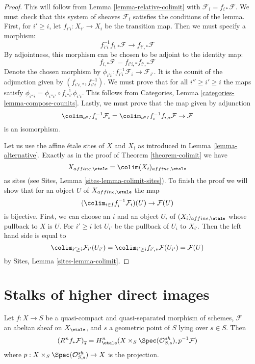 \begin{proof}
This will follow from Lemma \ref{lemma-relative-colimit}
with $\mathcal{F}_i = f_{i*}\mathcal{F}$. We 
must check that this system of sheaves $\mathcal{F}_i$ satisfies the conditions 
of the lemma. First, for $i' \geq i$, let
$f_{i'i}: X_{i'} \to X_i$ be 
the transition map. Then we must specify a morphism:
$$
f_{i'i}^{-1}f_{i, *}\mathcal{F} \to f_{i', *}\mathcal{F}
$$
By adjointness, this morphism can be chosen to be adjoint to the identity map:
$$
f_{i, *}\mathcal{F} = f_{i'i, *}f_{i', *}\mathcal{F}
$$
Denote the chosen morphism by
$\phi_{i'i} : f^{-1}_{i'i}\mathcal{F}_i \to \mathcal{F}_{i'}$.
It is the counit of the adjunction given by 
$(f_{i'i, *}, f_{i'i}^{-1})$. We must prove that for all
$i'' \geq i' \geq i$ the maps satisfy
$\phi_{i''i} = \phi_{i''i'}\circ f_{i''i'}^{-1}\phi_{i'i}$. 
This follows from Categories, Lemma \ref{categories-lemma-compose-counits}.
Lastly, we must prove that the map given by adjunction
$$
\colim_{i \in I} f_i^{-1}\mathcal{F}_i =
\colim_{i \in I} f_i^{-1}f_{i, *}\mathcal{F}
\to \mathcal{F}
$$
is an isomorphism.

\medskip\noindent
Let us use the affine \'etale sites of $X$ and $X_i$ as introduced
in Lemma \ref{lemma-alternative}.
Exactly as in the proof of Theorem \ref{theorem-colimit} we have
$$
X_{affine, \etale} = \colim (X_i)_{affine, \etale}
$$
as sites (see Sites, Lemma \ref{sites-lemma-colimit-sites}).
To finish the proof we will show
that for an object $U$ of $X_{affine, \etale}$
the map
$$
(\colim_{i \in I} f_i^{-1}\mathcal{F}_i)(U) \to \mathcal{F}(U)
$$
is bijective. First, we can choose an $i$ and an object
$U_i$ of $(X_i)_{affine, \etale}$ whose pullback to $X$ is $U$.
For $i' \geq i$ let $U_{i'}$ be the pullback of $U_i$ to $X_{i'}$.
Then the left hand side is equal to
$$
\colim_{i' \geq i} \mathcal{F}_{i'}(U_{i'}) =
\colim_{i' \geq i} f_{i', *}\mathcal{F}(U_{i'}) =
\mathcal{F}(U)
$$
by Sites, Lemma \ref{sites-lemma-colimit}.
\end{proof}





\section{Stalks of higher direct images}
\label{section-stalks-direct-image}

\begin{theorem}
\label{theorem-higher-direct-images}
Let $f: X \to S$ be a quasi-compact and quasi-separated morphism of schemes,
$\mathcal{F}$ an abelian sheaf on $X_\etale$, and $\overline{s}$ a
geometric point of $S$ lying over $s \in S$. Then
$$
\left(R^nf_* \mathcal{F}\right)_{\overline{s}} =
H_\etale^n( X \times_S \Spec(\mathcal{O}_{S, s}^{sh}),
p^{-1}\mathcal{F})
$$
where $p : X \times_S \Spec(\mathcal{O}_{S, s}^{sh}) \to X$
is the projection.
\end{theorem}

